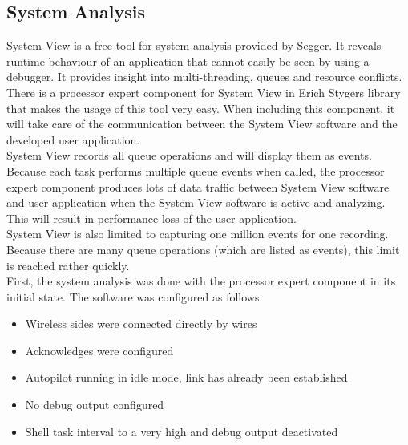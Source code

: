 \subsection{System Analysis}
System View is a free tool for system analysis provided by Segger. It reveals runtime behaviour of an application that cannot easily be seen by using a debugger. It provides insight into multi-threading, queues and resource conflicts.\\
There is a processor expert component for System View in Erich Stygers library that makes the usage of this tool very easy. When including this component, it will take care of the communication between the System View software and the developed user application.\\
System View records all queue operations and will display them as events. Because each task performs multiple queue events when called, the processor expert component produces lots of data traffic between System View software and user application when the System View software is active and analyzing. This will result in performance loss of the user application.\\
System View is also limited to capturing one million events for one recording. Because there are many queue operations (which are listed as events), this limit is reached rather quickly.\\
First, the system analysis was done with the processor expert component in its initial state. The software was configured as follows:
\begin{itemize}
    \item Wireless sides were connected directly by wires
    \item Acknowledges were configured
    \item Autopilot running in idle mode, link has already been established
    \item No debug output configured
    \item Shell task interval to a very high and debug output deactivated
\end{itemize}
%
%
%

